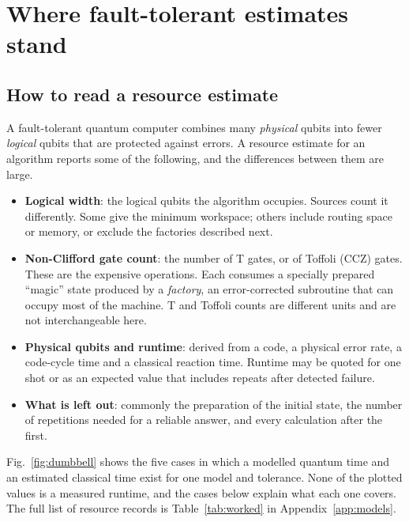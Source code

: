 \documentclass[10pt,a4paper]{article}
\begin{document}
\section{Where fault-tolerant estimates stand}
\label{sec:ft}

\subsection{How to read a resource estimate}
A fault-tolerant quantum computer combines many \emph{physical} qubits into fewer \emph{logical} qubits that are protected against errors. A resource estimate for an algorithm reports some of the following, and the differences between them are large.
\begin{itemize}
\item \textbf{Logical width}: the logical qubits the algorithm occupies. Sources count it differently. Some give the minimum workspace; others include routing space or memory, or exclude the factories described next.
\item \textbf{Non-Clifford gate count}: the number of T gates, or of Toffoli (CCZ) gates. These are the expensive operations. Each consumes a specially prepared ``magic'' state produced by a \emph{factory}, an error-corrected subroutine that can occupy most of the machine. T and Toffoli counts are different units and are not interchangeable here.
\item \textbf{Physical qubits and runtime}: derived from a code, a physical error rate, a code-cycle time and a classical reaction time. Runtime may be quoted for one shot or as an expected value that includes repeats after detected failure.
\item \textbf{What is left out}: commonly the preparation of the initial state, the number of repetitions needed for a reliable answer, and every calculation after the first.
\end{itemize}
Fig.~\ref{fig:dumbbell} shows the five cases in which a modelled quantum time and an estimated classical time exist for one model and tolerance. None of the plotted values is a measured runtime, and the cases below explain what each one covers. The full list of resource records is Table~\ref{tab:worked} in Appendix~\ref{app:models}.
\end{document}
